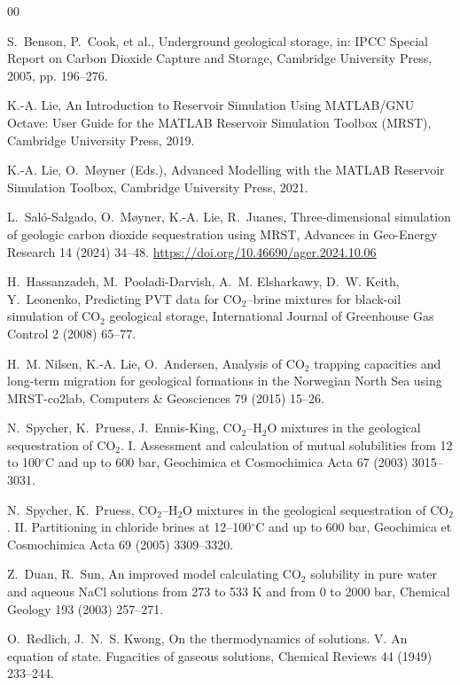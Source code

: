 \documentclass[preprint,11pt]{elsarticle}
\begin{document}
\begin{thebibliography}{00}

 S.~Benson, P.~Cook, et al., Underground geological
storage, in: IPCC Special Report on Carbon Dioxide Capture and Storage,
Cambridge University Press, 2005, pp. 196--276.

 K.-A. Lie, An Introduction to Reservoir Simulation
Using MATLAB/GNU Octave: User Guide for the MATLAB Reservoir Simulation
Toolbox (MRST), Cambridge University Press, 2019.

 K.-A. Lie, O.~M{\o}yner (Eds.), Advanced
Modelling with the MATLAB Reservoir Simulation Toolbox, Cambridge
University Press, 2021.

 L.~Sal\'o-Salgado, O.~M{\o}yner, K.-A. Lie,
R.~Juanes, Three-dimensional simulation of geologic carbon dioxide
sequestration using MRST, Advances in Geo-Energy Research 14 (2024)
34--48. \url{https://doi.org/10.46690/ager.2024.10.06}

 H.~Hassanzadeh, M.~Pooladi-Darvish,
A.~M. Elsharkawy, D.~W. Keith, Y.~Leonenko, Predicting PVT data for
CO$_2$--brine mixtures for black-oil simulation of CO$_2$ geological
storage, International Journal of Greenhouse Gas Control 2 (2008)
65--77.

 H.~M. Nilsen, K.-A. Lie, O.~Andersen, Analysis of
CO$_2$ trapping capacities and long-term migration for geological
formations in the Norwegian North Sea using MRST-co2lab, Computers \&
Geosciences 79 (2015) 15--26.

 N.~Spycher, K.~Pruess, J.~Ennis-King,
CO$_2$--H$_2$O mixtures in the geological sequestration of CO$_2$. I.
Assessment and calculation of mutual solubilities from 12 to 100$^\circ$C
and up to 600 bar, Geochimica et Cosmochimica Acta 67 (2003) 3015--3031.

 N.~Spycher, K.~Pruess, CO$_2$--H$_2$O mixtures in
the geological sequestration of CO$_2$. II. Partitioning in chloride
brines at 12--100$^\circ$C and up to 600 bar, Geochimica et Cosmochimica
Acta 69 (2005) 3309--3320.

 Z.~Duan, R.~Sun, An improved model calculating CO$_2$
solubility in pure water and aqueous NaCl solutions from 273 to 533 K
and from 0 to 2000 bar, Chemical Geology 193 (2003) 257--271.

 O.~Redlich, J.~N.~S. Kwong, On the thermodynamics
of solutions. V. An equation of state. Fugacities of gaseous solutions,
Chemical Reviews 44 (1949) 233--244.


\end{thebibliography}
\end{document}
